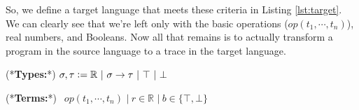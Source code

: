     So, we define a target language that meets these criteria in Listing \ref{lst:target}.
    We can clearly see that we're left only with the basic operations ($op(t_1,\dotsb,t_n)$), real numbers, and Booleans.
    Now all that remains is to actually transform a program in the source language to a trace in the target language.

    \begin{deflisting}[caption={Target language},label=lst:target]
    (*\textbf{Types:}*)
        $\sigma,\tau\deq\mathbb{R}\ |\ \sigma\to\tau\ |\ \top\ |\ \bot$

    (*\textbf{Terms:}*)
        $\ \ op(t_1,\dotsb,t_n)$
        $|\ r\in\mathbb{R}$
        $|\ b\in\{\top,\bot\}$
    \end{deflisting}